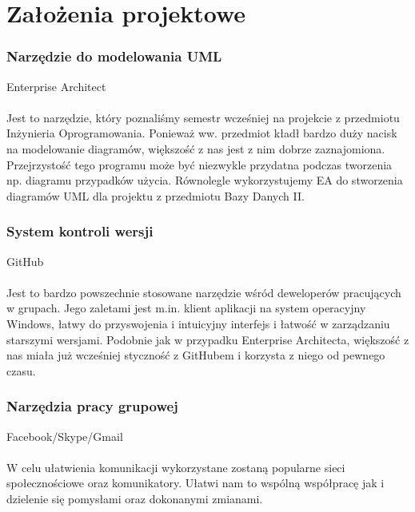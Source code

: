 \documentclass[a4paper,twoside]{article}
\begin{document}


\newpage

\part{\huge \textbf{Założenia projektowe}}

\section{Narzędzie do modelowania UML}

{\Large Enterprise Architect} \\\\
Jest to narzędzie, który poznaliśmy semestr wcześniej na projekcie z przedmiotu Inżynieria Oprogramowania. Ponieważ ww. przedmiot kładł bardzo duży nacisk na modelowanie diagramów, większość z nas jest z nim dobrze zaznajomiona. Przejrzystość tego programu może być niezwykle przydatna podczas tworzenia np. diagramu przypadków użycia. Równolegle wykorzystujemy EA do stworzenia diagramów UML dla projektu z przedmiotu Bazy Danych II.

\section{System kontroli wersji}

{\Large GitHub} \\\\
Jest to bardzo powszechnie stosowane narzędzie wśród deweloperów pracujących w grupach. Jego zaletami jest m.in. klient aplikacji na system operacyjny Windows, łatwy do przyswojenia i intuicyjny interfejs i łatwość w zarządzaniu starszymi wersjami. Podobnie jak w przypadku Enterprise Architecta, większość z nas miała już wcześniej styczność z GitHubem i korzysta z niego od pewnego czasu.

\section{Narzędzia pracy grupowej}

{\Large Facebook/Skype/Gmail} \\\\
W celu ułatwienia komunikacji wykorzystane zostaną popularne sieci społecznościowe oraz komunikatory. Ułatwi nam to wspólną współpracę jak i dzielenie się pomysłami oraz dokonanymi zmianami.
\end{document}

